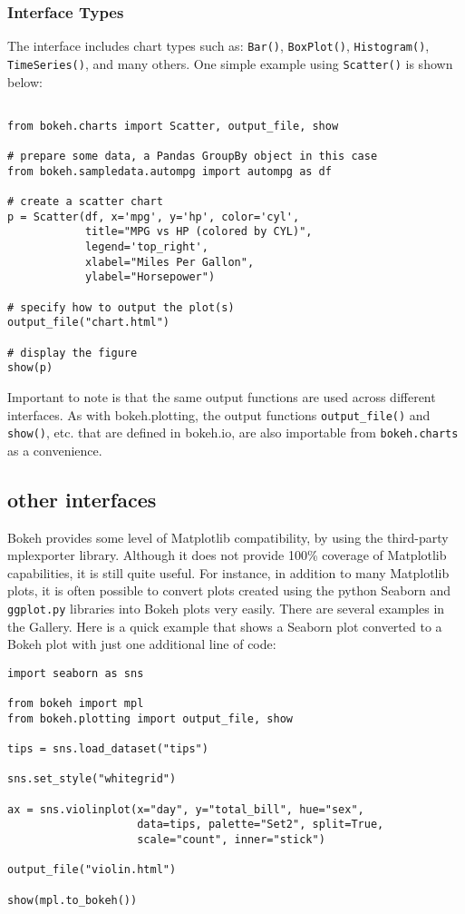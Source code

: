 \subsubsection{Interface Types}
The interface includes chart types such as: \texttt{Bar()}, \texttt{BoxPlot()}, \texttt{Histogram()}, \texttt{TimeSeries()}, and many others. One simple example using \texttt{Scatter()} is shown below:
\begin{framed}
	\begin{verbatim}
	
from bokeh.charts import Scatter, output_file, show

# prepare some data, a Pandas GroupBy object in this case
from bokeh.sampledata.autompg import autompg as df

# create a scatter chart
p = Scatter(df, x='mpg', y='hp', color='cyl',
            title="MPG vs HP (colored by CYL)",
            legend='top_right',
            xlabel="Miles Per Gallon",
            ylabel="Horsepower")

# specify how to output the plot(s)
output_file("chart.html")

# display the figure
show(p)
\end{verbatim}
\end{framed}
Important to note is that the same output functions are used across different interfaces. As with bokeh.plotting, the output functions \texttt{output\_file()} and \texttt{show()}, etc. that are defined in bokeh.io, are also importable from \texttt{bokeh.charts} as a convenience.

\subsection{other interfaces}
Bokeh provides some level of Matplotlib compatibility, by using the third-party mplexporter library. Although it does not provide 100\% coverage of Matplotlib capabilities, it is still quite useful. For instance, in addition to many Matplotlib plots, it is often possible to convert plots created using the python Seaborn and \texttt{ggplot.py} libraries into Bokeh plots very easily. There are several examples in the Gallery. Here is a quick example that shows a Seaborn plot converted to a Bokeh plot with just one additional line of code:

\begin{framed}
	\begin{verbatim}
import seaborn as sns

from bokeh import mpl
from bokeh.plotting import output_file, show

tips = sns.load_dataset("tips")

sns.set_style("whitegrid")

ax = sns.violinplot(x="day", y="total_bill", hue="sex",
                    data=tips, palette="Set2", split=True,
                    scale="count", inner="stick")

output_file("violin.html")

show(mpl.to_bokeh())
	
\end{verbatim}
\end{framed}

